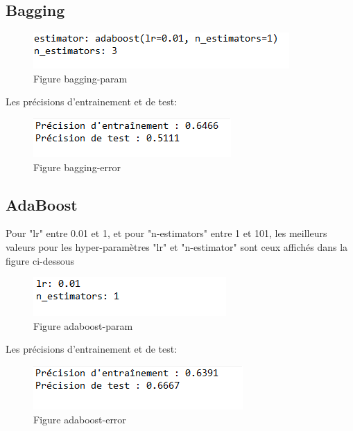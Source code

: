 \subsection{Bagging}
\begin{figure}[H]
    \centering
    \includegraphics{bagging_param.PNG}
    \caption{Figure bagging-param }
    \label{Figure fichier bagging-param }
\end{figure}
\par Les précisions d'entrainement et de test:
\begin{figure}[H]
    \centering
    \includegraphics{bagging.PNG}
    \caption{Figure bagging-error }
    \label{Figure fichier bagging-error }
\end{figure}
\subsection{AdaBoost} 
\par Pour "lr" entre 0.01 et 1, et pour "n-estimators" entre 1 et 101, les meilleurs valeurs pour les hyper-paramètres "lr" et "n-estimator" sont ceux affichés dans la figure ci-dessous
\begin{figure}[H]
    \centering
    \includegraphics{adaboost_param.PNG}
    \caption{Figure adaboost-param }
    \label{Figure fichier adaboost-param }
\end{figure}
\par Les précisions d'entrainement et de test:
\begin{figure}[H]
    \centering
    \includegraphics{adaboost.PNG}
    \caption{Figure adaboost-error }
    \label{Figure fichier adaboost-error }
\end{figure}


